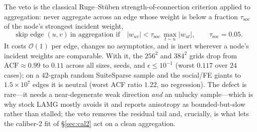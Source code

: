 \documentclass{siamart220329}
\newcommand{\Oone}{\mathcal{O}(1)}
\newcommand{\acf}{\mathrm{ACF}}
\begin{document}
The veto is the classical Ruge--St\"uben strength-of-connection criterion \cite{ruge-stuben}
applied to aggregation: never aggregate across an edge whose weight is below a fraction
$\tau_{\mathrm{soc}}$ of the node's strongest incident weight,
\begin{equation}\label{eq:soc}
\text{skip edge }(u,v)\ \text{in aggregation if}\quad |w_{uv}|<\tau_{\mathrm{soc}}\,\max_{t\sim u}|w_{ut}|,
\qquad \tau_{\mathrm{soc}}=0.05 .
\end{equation}
It costs $\Oone$ per edge, changes no asymptotics, and is inert wherever a node's incident
weights are comparable. With it, the $256^2$ and $384^2$ grids drop from $\acf\approx0.99$ to
$0.11$ across all sizes, seeds, and $\epsilon\le10^{-1}$ (worst $0.117$ over $24$ cases); on a
$42$-graph random SuiteSparse sample and the social/FE giants to $1.5\times10^7$ edges it is
neutral (worst ACF ratio $1.22$, no regression). The defect is rare---it needs a near-degenerate
weak direction \emph{and} an unlucky sample---which is why stock LAMG mostly avoids it and
reports anisotropy as bounded-but-slow rather than stalled; the veto removes the residual tail
and, crucially, is what lets the caliber-2 fit of \S\ref{sec:cal2} act on a clean aggregation.
\end{document}
